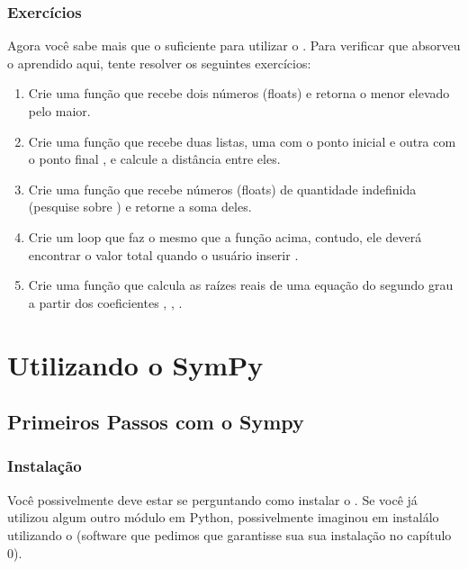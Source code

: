 \documentclass[letterpaper,10pt,english]{jupyterBook}
\begin{document}
\section{Exercícios}
\label{\detokenize{chapters/2:exercicios}}
\sphinxAtStartPar
Agora você sabe mais que o suficiente para utilizar o . Para verificar que absorveu o aprendido aqui, tente resolver os seguintes exercícios:
\begin{enumerate}
%
\item {} 
\sphinxAtStartPar
Crie uma função que recebe dois números (floats) e retorna o menor elevado pelo maior.

\item {} 
\sphinxAtStartPar
Crie uma função que recebe duas listas, uma com o ponto inicial e outra com o ponto final \sphinxcode{\sphinxupquote{{[}x,y{]}}}, e calcule a distância entre eles.

\item {} 
\sphinxAtStartPar
Crie uma função que recebe números (floats) de quantidade indefinida (pesquise sobre ) e retorne a soma deles.

\item {} 
\sphinxAtStartPar
Crie um loop que faz o mesmo que a função acima, contudo, ele deverá encontrar o valor total quando o usuário inserir .

\item {} 
\sphinxAtStartPar
Crie uma função que calcula as raízes reais de uma equação do segundo grau a partir dos coeficientes , , .

\end{enumerate}


\part{Utilizando o SymPy}


\chapter{Primeiros Passos com o Sympy}
\label{\detokenize{chapters/3:primeiros-passos-com-o-sympy}}\label{\detokenize{chapters/3::doc}}

\section{Instalação}
\label{\detokenize{chapters/3:instalacao}}
\sphinxAtStartPar
Você possivelmente deve estar se perguntando como instalar o . Se você já utilizou algum outro módulo em Python, possivelmente imaginou em instalá\sphinxhyphen{}lo utilizando o  (software que pedimos que garantisse sua sua instalação no capítulo 0).
\end{document}
